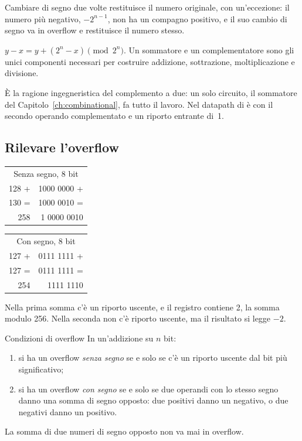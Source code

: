 Cambiare di segno due volte restituisce il numero originale, con un'eccezione:
il numero più negativo, $-2^{n-1}$, non ha un compagno positivo, e il suo
cambio di segno va in overflow e restituisce il numero stesso.


\begin{prgconcept}
$y - x = y + (2^{n}-x) \pmod{2^{n}}$. Un sommatore e un complementatore sono
gli unici componenti necessari per costruire addizione, sottrazione,
moltiplicazione e divisione.
\end{prgconcept}

È la ragione ingegneristica del complemento a due: un solo circuito, il
sommatore del Capitolo~\ref{ch:combinational}, fa tutto il lavoro. Nel datapath
di \riscv {} è  con il secondo operando complementato e un
riporto entrante di~1.

\subsection{Rilevare l'overflow}

\begin{center}\ttfamily
\begin{tabular}{@{}r@{\quad}r@{}}
\multicolumn{2}{c}{\textsf{\small Senza segno, 8 bit}}\\
128 + & 1000 0000 +\\ 130 = & 1000 0010 =\\\hline 258 & \textcolor{prgred}{1} 0000 0010
\end{tabular}\qquad\qquad\qquad
\begin{tabular}{@{}r@{\quad}r@{}}
\multicolumn{2}{c}{\textsf{\small Con segno, 8 bit}}\\
127 + & 0111 1111 +\\ 127 = & 0111 1111 =\\\hline 254 & \textcolor{prgred}{1}111 1110
\end{tabular}
\end{center}

Nella prima somma c'è un riporto uscente, e il registro contiene 2, la somma
modulo 256. Nella seconda non c'è riporto uscente, ma il risultato si legge
$-2$.

\begin{theorem}{Condizioni di overflow}
In un'addizione su $n$ bit:
\begin{enumerate}[nosep]
\item si ha un overflow \emph{senza segno} se e solo se c'è un riporto uscente
  dal bit più significativo;
\item si ha un overflow \emph{con segno} se e solo se due operandi con lo
  stesso segno danno una somma di segno opposto: due positivi danno un
  negativo, o due negativi danno un positivo.
\end{enumerate}
La somma di due numeri di segno opposto non va mai in overflow.
\end{theorem}

